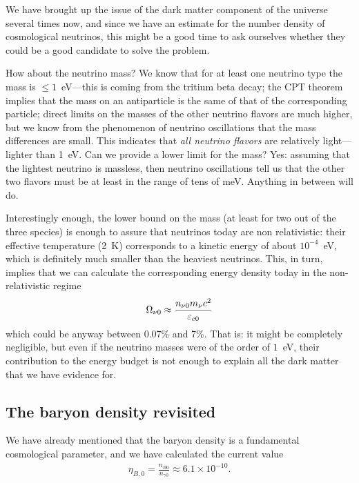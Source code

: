 We have brought up the issue of the dark matter component of the universe several
times now, and since we have an estimate for the number density of cosmological
neutrinos, this might be a good time to ask ourselves whether they could be a good
candidate to solve the problem.

How about the neutrino mass? We know that for at least one neutrino type the mass
is $\leq 1$~eV---this is coming from the tritium beta decay; the CPT theorem
implies that the mass on an antiparticle is the same of that of the corresponding
particle; direct limits on the masses of the other neutrino flavors are much higher,
but we know from the phenomenon of neutrino oscillations that the mass differences
are small. This indicates that \emph{all neutrino flavors} are relatively
light---lighter than 1~eV. Can we provide a lower limit for the mass? Yes: assuming
that the lightest neutrino is massless, then neutrino oscillations tell us that the
other two flavors must be at least in the range of tens of meV. Anything in between
will do.

Interestingly enough, the lower bound on the mass (at least for two out of the
three species) is enough to assure that neutrinos today are non relativistic:
their effective temperature (2~K) corresponds to a kinetic energy of about $10^{-4}$~eV,
which is definitely much smaller than the heaviest neutrinos. This, in turn, implies
that we can calculate the corresponding energy density today in the non-relativistic
regime
\begin{align*}
    \Omega_{\nu 0} \approx \frac{n_{\nu 0} m_\nu c^2}{\varepsilon_{c 0}}
\end{align*}
which could be anyway between 0.07\% and 7\%. That is: it might be completely
negligible, but even if the neutrino masses were of the order of $1$~eV, their
contribution to the energy budget is not enough to explain all the dark matter that
we have evidence for.



\subsection{The baryon density revisited}

We have already mentioned that the baryon density is a fundamental cosmological
parameter, and we have calculated the current value
\begin{align}
  \eta_{B,0} = \frac{n_{B 0}}{n_{\gamma 0}} \approx 6.1 \times 10^{-10}.
\end{align}

